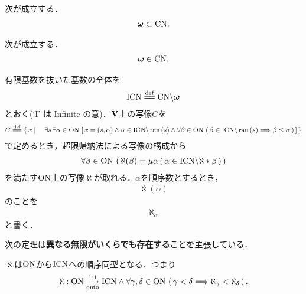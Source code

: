 	\begin{screen}
		\begin{thm}[自然数は基数]
			次が成立する．
			\begin{align}
				{\boldsymbol \omega} \subset \mathrm{CN}.
			\end{align}
		\end{thm}
	\end{screen}
	
	\begin{screen}
		\begin{thm}[$\Natural$は基数]
			次が成立する．
			\begin{align}
				{\boldsymbol \omega} \in \mathrm{CN}.
			\end{align}
		\end{thm}
	\end{screen}
	
	\begin{screen}
		\begin{dfn}
			有限基数を抜いた基数の全体を
			\begin{align}
				\InfCN \defeq \CN \backslash \Natural
			\end{align}
			とおく(`I' は Infinite の意)．$\mathbf{V}$上の写像$G$を
			\begin{align}
				G \defeq \Set{x}{\exists s\, \exists \alpha \in \ON\, 
				\left[\, x=(s,\alpha) \wedge \alpha \in \InfCN \backslash \ran{s} \wedge
				\forall \beta \in \ON\, \left(\, \beta \in \InfCN \backslash \ran{s}
				\Longrightarrow \beta \leq \alpha\, \right)\, \right]}
			\end{align}
			で定めるとき，超限帰納法による写像の構成から
			\begin{align}
				\forall \beta \in \mathrm{ON}\, 
				\left(\, \aleph(\beta) = \mu \alpha\, (\, \alpha \in \mathrm{ICN} \backslash \aleph \ast \beta\, )\, \right)
			\end{align}
			を満たす$\mathrm{ON}$上の写像$\aleph$が取れる．$\alpha$を順序数とするとき，
			\begin{align}
				\aleph(\alpha)
			\end{align}
			のことを
			\begin{align}
				\aleph_\alpha
			\end{align}
			と書く．
		\end{dfn}
	\end{screen}
	
	次の定理は{\bf 異なる無限がいくらでも存在する}ことを主張している．
	
	\begin{screen}
		\begin{thm}
			$\aleph$は$\mathrm{ON}$から$\mathrm{ICN}$への順序同型となる．つまり
			\begin{align}
				\aleph:\mathrm{ON} \underset{\mathrm{onto}}{\overset{\mathrm{1:1}}{\longrightarrow}} \mathrm{ICN} \wedge \forall \gamma, \delta \in \mathrm{ON}\, \left(\, \gamma < \delta
				\Longrightarrow \aleph_\gamma < \aleph_\delta\, \right).
			\end{align}
		\end{thm}
	\end{screen}
	
